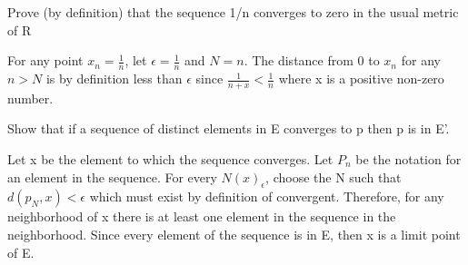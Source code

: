 \documentclass[12pt]{article}
\newenvironment{exercise}[2][Exercise]{\begin{trivlist}
\item[\hskip \labelsep {\bfseries #1}\hskip \labelsep {\bfseries #2.}]}{\end{trivlist}}
\begin{document}
\begin{exercise}{2.6}                                                                                      Prove (by definition) that the sequence 1/n converges to zero in the usual metric of R                     \end{exercise}
For any point $x_n = \frac{1}{n}$, let $\epsilon = \frac{1}{n}$ and $N = n$. The distance from 0 to $x_n$ for any $n > N$ is by definition less than $\epsilon$ since $\frac{1}{n+x} < \frac{1}{n}$ where x is a positive non-zero number.

\begin{exercise}{2.7}                                                                                      Show that if a sequence of distinct elements in E converges to p then p is in E'.                          \end{exercise}
Let x be the element to which the sequence converges. Let $P_n$ be the notation for an element in the sequence. For every $N(x)_\epsilon$, choose the N such that $d(p_N, x) < \epsilon$ which must exist by definition of convergent. Therefore, for any neighborhood of x there is at least one element in the sequence in the neighborhood. Since every element of the sequence is in E, then x is a limit point of E.

 
\end{document}

